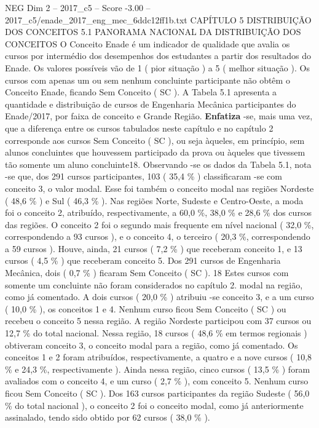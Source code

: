 \begin{textsample}{NEG Dim 2 – 2017\_c5 – Score -3.00 – 2017\_c5/enade\_2017\_eng\_mec\_6ddc12ff1b.txt}  \label{ex:f2_neg_043}
CAPÍTULO 5 DISTRIBUIÇÃO DOS CONCEITOS 5.1 PANORAMA NACIONAL DA DISTRIBUIÇÃO DOS CONCEITOS O Conceito Enade é um indicador de qualidade que avalia os cursos por intermédio dos desempenhos dos estudantes a partir dos resultados do Enade.
Os valores possíveis vão de 1 ( pior situação ) a 5 ( melhor situação ).
Os cursos com apenas um ou sem nenhum concluinte participante não obtêm o Conceito Enade, ficando Sem Conceito ( SC ).
A Tabela 5.1 apresenta a quantidade e distribuição de cursos de Engenharia Mecânica participantes do Enade/2017, por faixa de conceito e Grande Região. \textbf{Enfatiza} -se, mais uma vez, que a diferença entre os cursos tabulados neste capítulo e no capítulo 2 corresponde aos cursos Sem Conceito ( SC ), ou seja àqueles, em princípio, sem alunos concluintes que houvessem participado da prova ou àqueles que tivessem tão somente um aluno concluinte18.
Observando -se os dados da Tabela 5.1, nota -se que, dos 291 cursos participantes, 103 ( 35,4 \% ) classificaram -se com conceito 3, o valor modal.
Esse foi também o conceito modal nas regiões Nordeste ( 48,6 \% ) e Sul ( 46,3 \% ).
Nas regiões Norte, Sudeste e Centro-Oeste, a moda foi o conceito 2, atribuído, respectivamente, a 60,0 \%, 38,0 \% e 28,6 \% dos cursos das regiões.
O conceito 2 foi o segundo mais frequente em nível nacional ( 32,0 \%, correspondendo a 93 cursos ), e o conceito 4, o terceiro ( 20,3 \%, correspondendo a 59 cursos ).
Houve, ainda, 21 cursos ( 7,2 \% ) que receberam conceito 1, e 13 cursos ( 4,5 \% ) que receberam conceito 5.
Dos 291 cursos de Engenharia Mecânica, dois ( 0,7 \% ) ficaram Sem Conceito ( SC ). 18 Estes cursos com somente um concluinte não foram considerados no capítulo 2. modal na região, como já comentado.
A dois cursos ( 20,0 \% ) atribuiu -se conceito 3, e a um curso ( 10,0 \% ), os conceitos 1 e 4.
Nenhum curso ficou Sem Conceito ( SC ) ou recebeu o conceito 5 nessa região.
A região Nordeste participou com 37 cursos ou 12,7 \% do total nacional.
Nessa região, 18 cursos ( 48,6 \% em termos regionais ) obtiveram conceito 3, o conceito modal para a região, como já comentado.
Os conceitos 1 e 2 foram atribuídos, respectivamente, a quatro e a nove cursos ( 10,8 \% e 24,3 \%, respectivamente ).
Ainda nessa região, cinco cursos ( 13,5 \% ) foram avaliados com o conceito 4, e um curso ( 2,7 \% ), com conceito 5.
Nenhum curso ficou Sem Conceito ( SC ).
Dos 163 cursos participantes da região Sudeste ( 56,0 \% do total nacional ), o conceito 2 foi o conceito modal, como já anteriormente assinalado, tendo sido obtido por 62 cursos ( 38,0 \% ).

\end{textsample}
